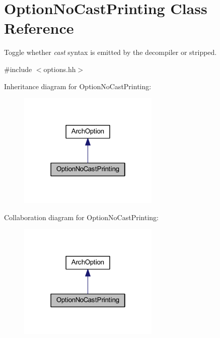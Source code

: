 \hypertarget{class_option_no_cast_printing}{}\section{Option\+No\+Cast\+Printing Class Reference}
\label{class_option_no_cast_printing}


Toggle whether {\itshape cast} syntax is emitted by the decompiler or stripped.  




{\ttfamily \#include $<$options.\+hh$>$}



Inheritance diagram for Option\+No\+Cast\+Printing\+:
\nopagebreak
\begin{figure}[H]
\begin{center}
\leavevmode
\includegraphics[width=190pt]{class_option_no_cast_printing__inherit__graph}
\end{center}
\end{figure}


Collaboration diagram for Option\+No\+Cast\+Printing\+:
\nopagebreak
\begin{figure}[H]
\begin{center}
\leavevmode
\includegraphics[width=190pt]{class_option_no_cast_printing__coll__graph}
\end{center}
\end{figure}
